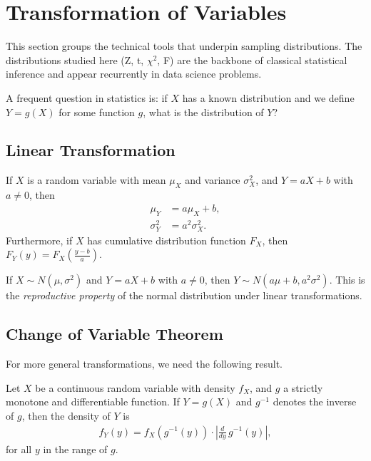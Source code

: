 \section{Transformation of Variables}

This section groups the technical tools that underpin sampling distributions. The distributions studied here (Z, t, $\chi^2$, F) are the backbone of classical statistical inference and appear recurrently in data science problems.


A frequent question in statistics is: if $X$ has a known distribution and we define $Y = g(X)$ for some function $g$, what is the distribution of $Y$?

\subsection{Linear Transformation}

\begin{teorema}
If $X$ is a random variable with mean $\mu_X$ and variance $\sigma_X^2$, and $Y = aX + b$ with $a \neq 0$, then
\begin{align}
 \label{eq:3.2.1}
 \mu_Y &= a\mu_X + b, \\
 \label{eq:3.2.2}
 \sigma_Y^2 &= a^2\sigma_X^2.
\end{align}
Furthermore, if $X$ has cumulative distribution function $F_X$, then
$F_Y(y) = F_X\!\left(\frac{y-b}{a}\right)$.
\end{teorema}

\begin{ejemplo}
 \label{exmp:3.2.1}
If $X \sim N(\mu, \sigma^2)$ and $Y = aX + b$ with $a \neq 0$, then
$Y \sim N(a\mu + b, a^2\sigma^2)$. This is the \emph{reproductive property} of the normal distribution under linear transformations.
\end{ejemplo}

\subsection{Change of Variable Theorem}

For more general transformations, we need the following result.

\begin{teorema}
Let $X$ be a continuous random variable with density $f_X$, and $g$ a strictly monotone and differentiable function. If $Y = g(X)$ and $g^{-1}$ denotes the inverse of $g$, then the density of $Y$ is
\begin{align}
 \label{eq:3.2.3}
 f_Y(y) = f_X\!\left(g^{-1}(y)\right) \cdot \left|\frac{d}{dy}\,g^{-1}(y)\right|,
\end{align}
for all $y$ in the range of $g$.
\end{teorema}

